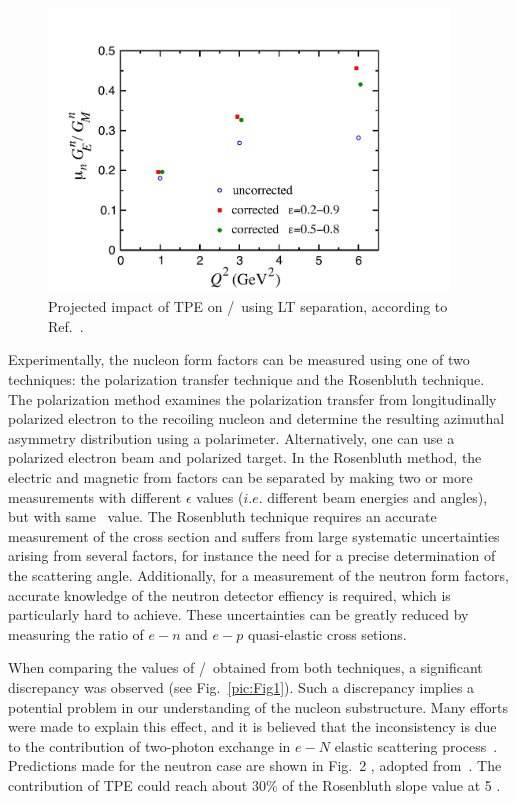\begin{figure}[th]
\includegraphics[width = 0.95\textwidth]{Plots/nTPE-BMT.pdf}
\caption{Projected impact of TPE on \gen/\gmn~using LT separation, according to Ref.~\cite{Blunden:2005ew}.}
\label{pic:Fig2}
\end{figure}
 
Experimentally, the nucleon form factors can be measured using one of two techniques: the polarization transfer technique and the Rosenbluth technique. 
The polarization method examines the polarization transfer from longitudinally polarized electron to the recoiling nucleon and 
determine the resulting azimuthal asymmetry distribution using a polarimeter. 
Alternatively, one can use a polarized electron beam and polarized target. 
In the Rosenbluth method, the electric and magnetic from factors can be separated by making two or more measurements with 
different $\epsilon$ values ($i.e.$ different beam energies and angles), but with same \qsq~value. 
The Rosenbluth technique requires an accurate measurement of the cross section and suffers from large systematic uncertainties arising from several factors, for instance
the need for a precise determination of the scattering angle. Additionally,
for a measurement of the neutron form factors, accurate knowledge of
the neutron detector effiency is required, which is particularly hard to
achieve.
These uncertainties can be greatly reduced by measuring the ratio of $e-n$ and $e-p$ quasi-elastic cross setions.

When comparing the values of \gep/\gmp~obtained from both techniques, a significant discrepancy was observed (see Fig.~\ref{pic:Fig1}). 
Such a discrepancy implies a potential problem in our understanding of the nucleon substructure. 
Many efforts were made to explain this effect, and it is believed that the inconsistency is due to the contribution of two-photon exchange
in $e-N$ elastic scattering process~\cite{Arrington:2011dn, Afanasev:2017gsk}.
Predictions made for the neutron case are shown in Fig.~2
, adopted from~\cite{Blunden:2005ew}.
The contribution of TPE could reach about 30\% of the Rosenbluth slope value at 5 \gevcsq.

